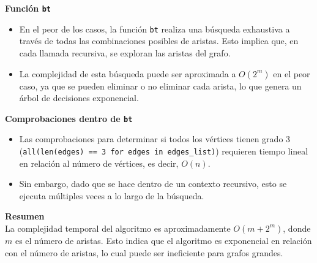 \documentclass[
10pt, %
a4paper, %
oneside, %
headinclude,footinclude, %
BCOR5mm, %
]{scrartcl}
\begin{document}
\textbf{Función \texttt{bt} }\\

\begin{itemize}
    \item En el peor de los casos, la función \texttt{bt} realiza una búsqueda exhaustiva a través de todas las combinaciones posibles de aristas. Esto implica que, en cada llamada recursiva, se exploran las aristas del grafo.
    \item La complejidad de esta búsqueda puede ser aproximada a \( O(2^m) \) en el peor caso, ya que se pueden eliminar o no eliminar cada arista, lo que genera un árbol de decisiones exponencial.
\end{itemize}


\textbf{Comprobaciones dentro de \texttt{bt}}\\

\begin{itemize}
    \item Las comprobaciones para determinar si todos los vértices tienen grado 3 (\texttt{all(len(edges) == 3 for edges in edges\_list)}) requieren tiempo lineal en relación al número de vértices, es decir, \( O(n) \).
    \item Sin embargo, dado que se hace dentro de un contexto recursivo, esto se ejecuta múltiples veces a lo largo de la búsqueda.
\end{itemize}


\textbf{Resumen}\\
La complejidad temporal del algoritmo es aproximadamente \( O(m + 2^m) \), donde \( m \) es el número de aristas. Esto indica que el algoritmo es exponencial en relación con el número de aristas, lo cual puede ser ineficiente para grafos grandes.

\renewcommand{\refname}{\spacedlowsmallcaps{References}} %




\end{document}
